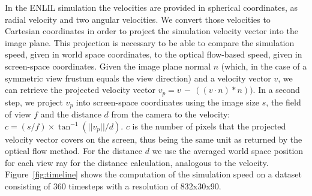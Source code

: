 \documentclass[journal]{vgtc}                %
\begin{document}
In the ENLIL simulation the velocities are provided in spherical coordinates, as radial velocity and two angular velocities. We convert those velocities to Cartesian coordinates in order to project the simulation velocity vector into the image plane. This projection is necessary to be able to compare the simulation speed, given in world space coordinates, to the optical flow-based speed, given in screen-space coordinates. Given the image plane normal $n$ (which, in the case of a symmetric view frustum equals the view direction) and a velocity vector $v$, we can retrieve the projected velocity vector $v_p = v\,-\,\left(\left(v \cdot n \right) * n \right))$. In a second step, we project $v_p$ into screen-space coordinates using the image size $s$, the field of view $f$ and the distance $d$ from the camera to the velocity: $ c = \left(s / f \right) \times \tan^{-1}\left( ||v_p|| / d \right)$. $c$ is the number of pixels that the projected velocity vector covers on the screen, thus being the same unit as returned by the optical flow method. For the distance $d$ we use the averaged world space position for each view ray for the distance calculation, analogous to the velocity. Figure~\ref{fig:timeline} shows the computation of the simulation speed on a dataset consisting of 360 timesteps with a resolution of 832x30x90.
\end{document}
